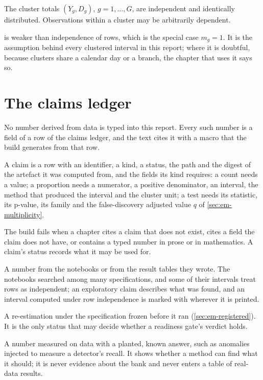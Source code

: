 \begin{assumption}\label{ass:clusters}
The cluster totals $(Y_g, D_g)$, $g = 1, \dots, G$, are independent and identically distributed. Observations within
a cluster may be arbitrarily dependent.
\end{assumption}

 is weaker than independence of rows, which is the special case $m_g = 1$. It is the assumption
behind every clustered interval in this report; where it is doubtful, because clusters share a calendar day or a
branch, the chapter that uses it says so.

\section{The claims ledger}\label{sec:em-ledger}

No number derived from data is typed into this report. Every such number is a field of a row of the claims ledger,
and the text cites it with a macro that the build generates from that row.

\begin{definition}[Claim]\label{def:claim}
A claim is a row with an identifier, a kind, a status, the path and the \shaname{} digest of the artefact it was
computed from, and the fields its kind requires: a count needs a value; a proportion needs a numerator, a positive
denominator, an interval, the method that produced the interval and the cluster unit; a test needs its statistic, its
p-value, its family and the false-discovery adjusted value $q$ of \cref{sec:em-multiplicity}.
\end{definition}

The build fails when a chapter cites a claim that does not exist, cites a field the claim does not have, or contains a
typed number in prose or in mathematics. A claim's status records what it may be used for.

\begin{description}[style=nextline]
  \item[Exploratory] A number from the notebooks or from the result tables they wrote. The notebooks searched among
  many specifications, and some of their intervals treat rows as independent; an exploratory claim describes what
  was found, and an interval computed under row independence is marked with \naivemark{} wherever it is printed.
  \item[Registered] A re-estimation under the specification frozen before it ran (\cref{sec:em-registered}). It is
  the only status that may decide whether a readiness gate's verdict holds.
  \item[Positive control] A number measured on data with a planted, known answer, such as anomalies injected to
  measure a detector's recall. It shows whether a method can find what it should; it is never evidence about the bank
  and never enters a table of real-data results.
\end{description}

